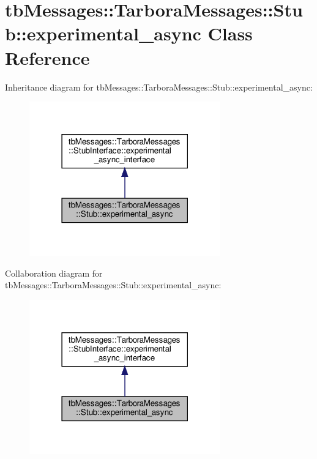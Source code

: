 \hypertarget{classtbMessages_1_1TarboraMessages_1_1Stub_1_1experimental__async}{}\section{tb\+Messages\+:\+:Tarbora\+Messages\+:\+:Stub\+:\+:experimental\+\_\+async Class Reference}
\label{classtbMessages_1_1TarboraMessages_1_1Stub_1_1experimental__async}


Inheritance diagram for tb\+Messages\+:\+:Tarbora\+Messages\+:\+:Stub\+:\+:experimental\+\_\+async\+:
\nopagebreak
\begin{figure}[H]
\begin{center}
\leavevmode
\includegraphics[width=234pt]{classtbMessages_1_1TarboraMessages_1_1Stub_1_1experimental__async__inherit__graph}
\end{center}
\end{figure}


Collaboration diagram for tb\+Messages\+:\+:Tarbora\+Messages\+:\+:Stub\+:\+:experimental\+\_\+async\+:
\nopagebreak
\begin{figure}[H]
\begin{center}
\leavevmode
\includegraphics[width=234pt]{classtbMessages_1_1TarboraMessages_1_1Stub_1_1experimental__async__coll__graph}
\end{center}
\end{figure}
